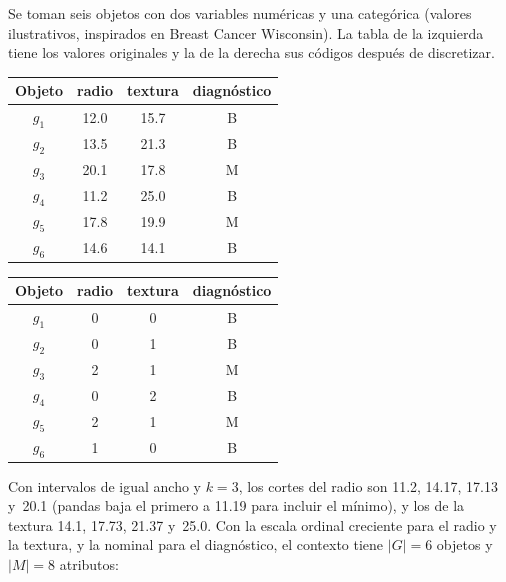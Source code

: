 Se toman seis objetos con dos variables numéricas y una categórica (valores ilustrativos, inspirados en Breast Cancer Wisconsin). La tabla de la izquierda tiene los valores originales y la de la derecha sus códigos después de discretizar.

\begin{center}
\small
\begin{tabular}{cccc}
  \toprule
  Objeto & radio & textura & diagnóstico \\
  \midrule
  $g_1$ & 12.0 & 15.7 & B \\
  $g_2$ & 13.5 & 21.3 & B \\
  $g_3$ & 20.1 & 17.8 & M \\
  $g_4$ & 11.2 & 25.0 & B \\
  $g_5$ & 17.8 & 19.9 & M \\
  $g_6$ & 14.6 & 14.1 & B \\
  \bottomrule
\end{tabular}
\qquad\qquad
\begin{tabular}{cccc}
  \toprule
  Objeto & radio & textura & diagnóstico \\
  \midrule
  $g_1$ & 0 & 0 & B \\
  $g_2$ & 0 & 1 & B \\
  $g_3$ & 2 & 1 & M \\
  $g_4$ & 0 & 2 & B \\
  $g_5$ & 2 & 1 & M \\
  $g_6$ & 1 & 0 & B \\
  \bottomrule
\end{tabular}
\end{center}

Con intervalos de igual ancho y $k = 3$, los cortes del radio son 11.2, 14.17, 17.13 y~20.1 (pandas baja el primero a 11.19 para incluir el mínimo), y los de la textura 14.1, 17.73, 21.37 y~25.0. Con la escala ordinal creciente para el radio y la textura, y la nominal para el diagnóstico, el contexto tiene $\lvert G \rvert = 6$ objetos y $\lvert M \rvert = 8$ atributos:


